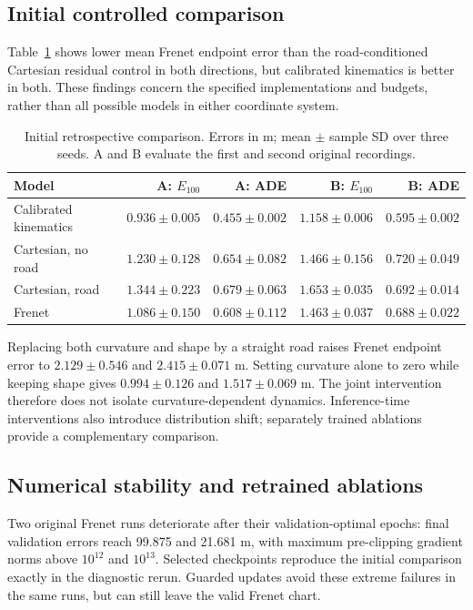 \documentclass[preprint,12pt]{elsarticle}
\begin{document}
\subsection{Initial controlled comparison}\label{sec:donkeyreal_results}
Table~\ref{tab:controlled} shows lower mean Frenet endpoint error than the
road-conditioned Cartesian residual control in both directions, but calibrated
kinematics is better in both. These findings concern the specified implementations
and budgets, rather than all possible models in either coordinate system.
\begin{table}[t]
\centering
\caption{Initial retrospective comparison. Errors in m; mean $\pm$ sample SD over three seeds. A and B evaluate the first and second original recordings.}
\label{tab:controlled}
\footnotesize
\setlength{\tabcolsep}{3pt}
\begin{tabular}{lrrrr}
\toprule
Model & A: $E_{100}$ & A: ADE & B: $E_{100}$ & B: ADE \\
\midrule
Calibrated kinematics & $0.936 \pm 0.005$ & $0.455 \pm 0.002$ & $1.158 \pm 0.006$ & $0.595 \pm 0.002$ \\
Cartesian, no road & $1.230 \pm 0.128$ & $0.654 \pm 0.082$ & $1.466 \pm 0.156$ & $0.720 \pm 0.049$ \\
Cartesian, road & $1.344 \pm 0.223$ & $0.679 \pm 0.063$ & $1.653 \pm 0.035$ & $0.692 \pm 0.014$ \\
Frenet & $1.086 \pm 0.150$ & $0.608 \pm 0.112$ & $1.463 \pm 0.037$ & $0.688 \pm 0.022$ \\
\bottomrule
\end{tabular}
\end{table}

Replacing both curvature and shape by a straight road raises Frenet endpoint
error to $2.129\pm0.546$ and $2.415\pm0.071$ m. Setting curvature alone to zero
while keeping shape gives $0.994\pm0.126$ and $1.517\pm0.069$ m. The joint
intervention therefore does not isolate curvature-dependent dynamics.
Inference-time interventions also introduce distribution shift; separately
trained ablations provide a complementary comparison.

\subsection{Numerical stability and retrained ablations}
Two original Frenet runs deteriorate after their validation-optimal epochs:
final validation errors reach 99.875 and 21.681 m, with maximum pre-clipping
gradient norms above $10^{12}$ and $10^{13}$. Selected checkpoints reproduce the
initial comparison exactly in the diagnostic rerun. Guarded updates avoid these
extreme failures in the same runs, but can still leave the valid Frenet chart.
\end{document}
